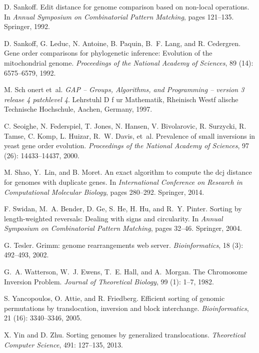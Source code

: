 \documentclass[utf8]{Frontiers_LaTex_Templates/frontiersFPHY} %
\numberwithin{equation}{section}
\begin{document}
\begin{thebibliography}{38}
D. Sankoff.
\newblock Edit distance for genome comparison based on non-local operations.
\newblock In \emph{Annual Symposium on Combinatorial Pattern Matching}, pages
  121--135. Springer, 1992.

D. Sankoff, G. Leduc, N. Antoine, B. Paquin, B.~F. Lang, and
  R. Cedergren.
\newblock Gene order comparisons for phylogenetic inference: {E}volution of the
  mitochondrial genome.
\newblock \emph{Proceedings of the National Academy of Sciences}, 89
  (14): 6575--6579, 1992.

M. Sch{ o}nert et~al.
\newblock \emph{{GAP} -- {Groups}, {Algorithms}, and {Programming} -- version 3
  release 4 patchlevel 4}.
\newblock Lehrstuhl D f{ u}r Mathematik, Rheinisch Westf{
  a}lische Technische Hoch\-schule, Aachen, Germany, 1997.

C. Seoighe, N. Federspiel, T. Jones, N. Hansen, V. Bivolarovic,
  R. Surzycki, R. Tamse, C. Komp, L. Huizar, R.~W. Davis,
  et~al.
\newblock Prevalence of small inversions in yeast gene order evolution.
\newblock \emph{Proceedings of the National Academy of Sciences}, 97
  (26): 14433--14437, 2000.

M. Shao, Y.~Lin, and B. Moret.
\newblock An exact algorithm to compute the dcj distance for genomes with
  duplicate genes.
\newblock In \emph{International Conference on Research in Computational
  Molecular Biology}, pages 280--292. Springer, 2014.

F. Swidan, M.~A. Bender, D. Ge, S. He, H. Hu, and R.~Y.
  Pinter.
\newblock Sorting by length-weighted reversals: Dealing with signs and
  circularity.
\newblock In \emph{Annual Symposium on Combinatorial Pattern Matching}, pages
  32--46. Springer, 2004.

G. Tesler.
\newblock Grimm: genome rearrangements web server.
\newblock \emph{Bioinformatics}, 18 (3): 492--493, 2002.

G.~A. Watterson, W.~J. Ewens, T.~E. Hall, and A.~Morgan.
\newblock The {C}hromosome {I}nversion {P}roblem.
\newblock \emph{Journal of Theoretical Biology}, 99 (1):
  1--7, 1982.

S. Yancopoulos, O. Attie, and R. Friedberg.
\newblock Efficient sorting of genomic permutations by translocation, inversion
  and block interchange.
\newblock \emph{Bioinformatics}, 21 (16): 3340--3346, 2005.

X. Yin and D. Zhu.
\newblock Sorting genomes by generalized translocations.
\newblock \emph{Theoretical Computer Science}, 491: 127--135, 2013.

\end{thebibliography}
\end{document}
